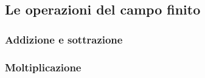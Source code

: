 
\subsection{Le operazioni del campo finito} %



\textsf{\small }

\subsubsection{Addizione e sottrazione} %


\textsf{\small }

\subsubsection{Moltiplicazione}


